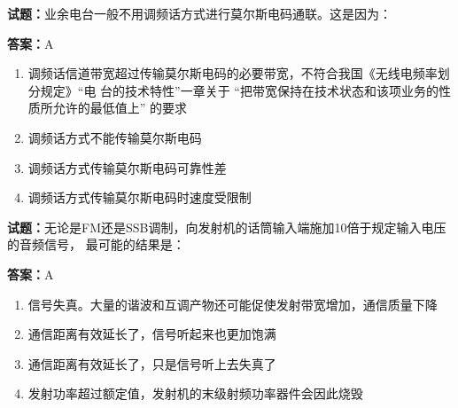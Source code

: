\documentclass{ctexbook}
\begin{document}




\vspace{1em}

\textbf{试题：}业余电台一般不用调频话方式进行莫尔斯电码通联。这是因为： 

\textbf{答案：}A 

\begin{enumerate}[leftmargin=3em]
  \item 调频话信道带宽超过传输莫尔斯电码的必要带宽，不符合我国《无线电频率划分规定》“电
台的技术特性”一章关于 “把带宽保持在技术状态和该项业务的性质所允许的最低值上”
的要求 

  \item 调频话方式不能传输莫尔斯电码 

  \item 调频话方式传输莫尔斯电码可靠性差 

  \item 调频话方式传输莫尔斯电码时速度受限制 

\end{enumerate}





\vspace{1em}

\textbf{试题：}无论是FM还是SSB调制，向发射机的话筒输入端施加10倍于规定输入电压的音频信号，
最可能的结果是： 

\textbf{答案：}A 

\begin{enumerate}[leftmargin=3em]
  \item 信号失真。大量的谐波和互调产物还可能促使发射带宽增加，通信质量下降 

  \item 通信距离有效延长了，信号听起来也更加饱满 

  \item 通信距离有效延长了，只是信号听上去失真了 

  \item 发射功率超过额定值，发射机的末级射频功率器件会因此烧毁 

\end{enumerate}





\vspace{1em}
\end{document}
